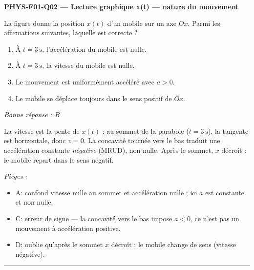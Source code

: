 \documentclass[11pt,a4paper]{article}
\begin{document}
\noindent\textbf{PHYS-F01-Q02 --- Lecture graphique x(t) --- nature du mouvement}\par
La figure donne la position $x(t)$ d'un mobile sur un axe $Ox$. Parmi les affirmations suivantes, laquelle est correcte ?
\begin{center}
\end{center}
\begin{enumerate}[label=\Alph*)]
\item À $t=\qty{3}{\second}$, l'accélération du mobile est nulle.
\item À $t=\qty{3}{\second}$, la vitesse du mobile est nulle.
\item Le mouvement est uniformément accéléré avec $a>0$.
\item Le mobile se déplace toujours dans le sens positif de $Ox$.
\end{enumerate}
\textit{Bonne réponse : B}\par
La vitesse est la pente de $x(t)$ : au sommet de la parabole ($t=\qty{3}{\second}$), la tangente est horizontale, donc $v=0$. La concavité tournée vers le bas traduit une accélération constante \emph{négative} (MRUD), non nulle. Après le sommet, $x$ décroît : le mobile repart dans le sens négatif.\par
\textit{Pièges :}
\begin{itemize}
\item A: confond vitesse nulle au sommet et accélération nulle ; ici $a$ est constante et non nulle.
\item C: erreur de signe --- la concavité vers le bas impose $a<0$, ce n'est pas un mouvement à accélération positive.
\item D: oublie qu'après le sommet $x$ décroît ; le mobile change de sens (vitesse négative).
\end{itemize}
\vspace{8pt}\hrule\vspace{8pt}
\end{document}
